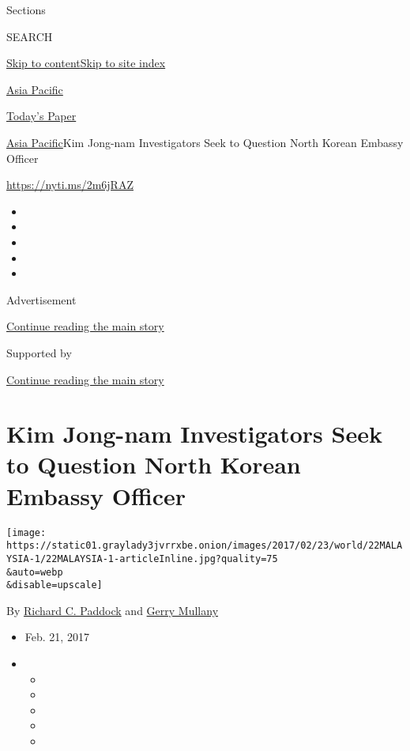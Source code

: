 Sections

SEARCH

\protect\hyperlink{site-content}{Skip to
content}\protect\hyperlink{site-index}{Skip to site index}

\href{https://www.nytimes3xbfgragh.onion/section/world/asia}{Asia
Pacific}

\href{https://myaccount.nytimes3xbfgragh.onion/auth/login?response_type=cookie\&client_id=vi}{}

\href{https://www.nytimes3xbfgragh.onion/section/todayspaper}{Today's
Paper}

\href{/section/world/asia}{Asia Pacific}\textbar{}Kim Jong-nam
Investigators Seek to Question North Korean Embassy Officer

\url{https://nyti.ms/2m6jRAZ}

\begin{itemize}
\item
\item
\item
\item
\item
\end{itemize}

Advertisement

\protect\hyperlink{after-top}{Continue reading the main story}

Supported by

\protect\hyperlink{after-sponsor}{Continue reading the main story}

\hypertarget{kim-jong-nam-investigators-seek-to-question-north-korean-embassy-officer}{%
\section{Kim Jong-nam Investigators Seek to Question North Korean
Embassy
Officer}\label{kim-jong-nam-investigators-seek-to-question-north-korean-embassy-officer}}

\texttt{[image: https://static01.graylady3jvrrxbe.onion/images/2017/02/23/world/22MALAYSIA-1/22MALAYSIA-1-articleInline.jpg?quality=75\\\&auto=webp\\\&disable=upscale]}

By
\href{https://www.nytimes3xbfgragh.onion/by/richard-c-paddock}{Richard
C. Paddock} and
\href{http://www.nytimes3xbfgragh.onion/by/gerry-mullany}{Gerry Mullany}

\begin{itemize}
\item
  Feb. 21, 2017
\item
  \begin{itemize}
  \item
  \item
  \item
  \item
  \item
  \end{itemize}
\end{itemize}

